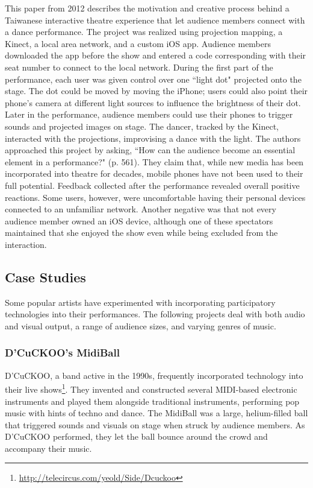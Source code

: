 This paper from 2012 describes the motivation and creative process behind a Taiwanese interactive theatre experience that let audience members connect with a dance performance. The project was realized using projection mapping, a Kinect, a local area network, and a custom iOS app. Audience members downloaded the app before the show and entered a code corresponding with their seat number to connect to the local network. During the first part of the performance, each user was given control over one ``light dot" projected onto the stage. The dot could be moved by moving the iPhone; users could also point their phone's camera at different light sources to influence the brightness of their dot. Later in the performance, audience members could use their phones to trigger sounds and projected images on stage. The dancer, tracked by the Kinect, interacted with the projections, improvising a dance with the light. The authors approached this project by asking, ``How can the audience become an essential element in a performance?" (p. 561). They claim that, while new media has been incorporated into theatre for decades, mobile phones have not been used to their full potential. Feedback collected after the performance revealed overall positive reactions. Some users, however, were uncomfortable having their personal devices connected to an unfamiliar network. Another negative was that not every audience member owned an iOS device, although one of these spectators maintained that she enjoyed the show even while being excluded from the interaction.

\subsection{Case Studies}

Some popular artists have experimented with incorporating participatory technologies into their performances. The following projects deal with both audio and visual output, a range of audience sizes, and varying genres of music.

\subsubsection{D'CuCKOO's MidiBall}

D'CuCKOO, a band active in the 1990s, frequently incorporated technology into their live shows\footnote{\url{http://telecircus.com/yeold/Side/Dcuckoo}}. They invented and constructed several MIDI-based electronic instruments and played them alongside traditional instruments, performing pop music with hints of techno and dance. The MidiBall was a large, helium-filled ball that triggered sounds and visuals on stage when struck by audience members. As D'CuCKOO performed, they let the ball bounce around the crowd and accompany their music.

